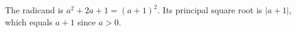 The radicand is $a^2+2a+1=(a+1)^2$. Its principal square root is $|a+1|$, which equals $a+1$ since $a>0$.
